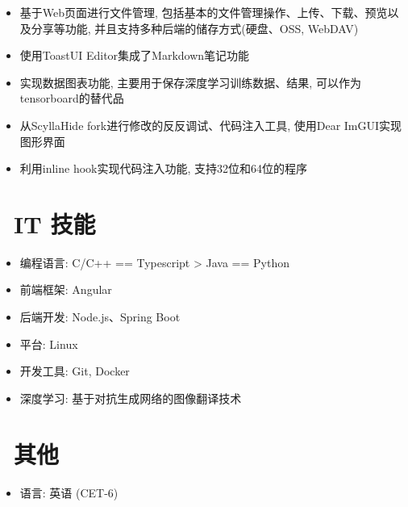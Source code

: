 \documentclass{resume}
\begin{document}
\begin{onehalfspacing}
\begin{itemize}
  \item 基于Web页面进行文件管理, 包括基本的文件管理操作、上传、下载、预览以及分享等功能, 并且支持多种后端的储存方式(硬盘、OSS, WebDAV)
  \item 使用ToastUI Editor集成了Markdown笔记功能
  \item 实现数据图表功能, 主要用于保存深度学习训练数据、结果, 可以作为tensorboard的替代品
\end{itemize}
\end{onehalfspacing}


\begin{onehalfspacing}
\begin{itemize}
  \item 从ScyllaHide fork进行修改的反反调试、代码注入工具, 使用Dear ImGUI实现图形界面
  \item 利用inline hook实现代码注入功能, 支持32位和64位的程序
\end{itemize}
\end{onehalfspacing}

\section{\faCogs\ IT 技能}
\begin{itemize}[parsep=0.5ex]
  \item 编程语言: C/C++ == Typescript > Java == Python
  \item 前端框架: Angular
  \item 后端开发: Node.js、Spring Boot
  \item 平台: Linux
  \item 开发工具: Git, Docker
  \item 深度学习: 基于对抗生成网络的图像翻译技术
\end{itemize}


\section{\faInfo\ 其他}
\begin{itemize}[parsep=0.5ex]
  \item 语言: 英语 (CET-6)
\end{itemize}

%
%
\end{document}

